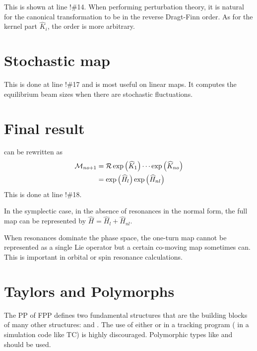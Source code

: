 \documentclass{hitec}     %
\newcommand{\Section}[1]{\section{#1}\vspace*{-1ex}}
\begin{document}
{{{{{{{This is shown at line !\#14.  When performing perturbation theory, it is natural for the canonical transformation to be in the reverse Dragt-Finn order. As for the kernel part   ${{\widehat{K}}_{i}}$, the order is more arbitrary.

\section{Stochastic map}\label{s:normfinalstoch}

This is done at line !\#17 and is most useful on linear maps. It computes the equilibrium beam sizes  when there are  stochastic fluctuations.


\section{Final result}\label{s:normfinal}

 can be rewritten as 
%
\begin{align} {{\cal M}}_{no+1}&=
{\cal R}\exp\left({{\widehat{K}}_{1}}\right)\cdots\exp\left({{\widehat{K}}_{no}}\right)\nonumber \\
 &=\exp\left({{\widehat{H}}_{l}}\right)\exp\left({{\widehat{H}}_{nl}}\right) \label{eq:finalnomf}\end{align}
This is done at line !\#18.

In the symplectic case, in the absence of resonances  in the normal form, the  full map can be represented by ${\widehat{H}}_{}={\widehat{H}}_{l}+{\widehat{H}}_{nl}$. 

 
When resonances dominate the phase space, the one-turn map cannot be represented as a single Lie operator but a certain co-moving map sometimes can. This is important in orbital or spin resonance calculations.

\Section{Taylors and Polymorphs}
\label{s:fundamental}
 
The PP of FPP defines two fundamental structures that are the building blocks of many other structures:
 and . The  use of either  or   in a tracking program (
in a  simulation code like  TC) is highly discouraged. Polymorphic types like  and 
should be used.

}}}}}}}
\end{document}
